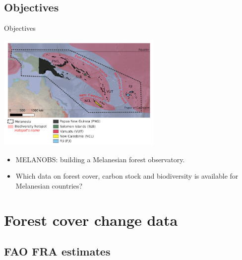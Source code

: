\documentclass[10pt,table,dvipsnames,compress]{beamer}
\begin{document}
\subsection{Objectives}
\label{sec:orga89ace8}

\begin{frame}[label={sec:orgabc040a}]{Objectives}
\begin{center}
\includegraphics[width=8cm]{figs/carte_melanobs.jpg}
\end{center}

\begin{itemize}
\item MELANOBS: building a Melanesian forest observatory.
\item Which data on forest cover, carbon stock and biodiversity is available for Melanesian countries?
\end{itemize}
\end{frame}

\section{Forest cover change data}
\label{sec:org0b43bc5}

\subsection{FAO FRA estimates}
\label{sec:org477b14d}
\end{document}
